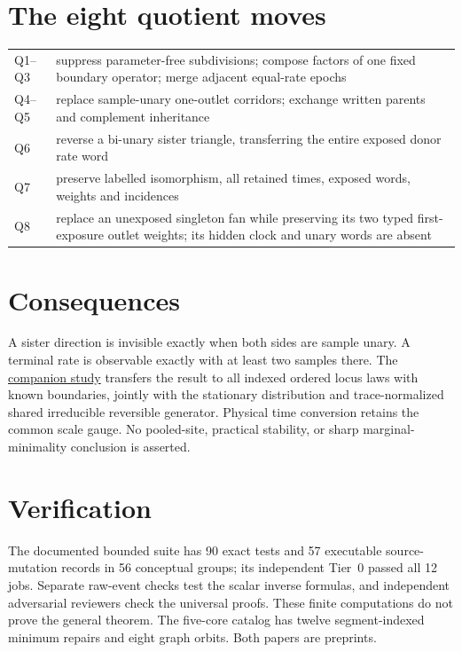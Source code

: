 \documentclass[10pt]{article}
\begin{document}
\section*{The eight quotient moves}
\begin{tabularx}{\textwidth}{@{}p{}X@{}}\toprule
Q1--Q3 & suppress parameter-free subdivisions; compose factors of one fixed boundary operator; merge adjacent equal-rate epochs\\
Q4--Q5 & replace sample-unary one-outlet corridors; exchange written parents and complement inheritance\\
Q6 & reverse a bi-unary sister triangle, transferring the entire exposed donor rate word\\
Q7 & preserve labelled isomorphism, all retained times, exposed words, weights and incidences\\
Q8 & replace an unexposed singleton fan while preserving its two typed first-exposure outlet weights; its hidden clock and unary words are absent\\\bottomrule
\end{tabularx}

\section*{Consequences}
A sister direction is invisible exactly when both sides are sample unary. A terminal rate is observable exactly with at least two samples there. The \href{https://doi.org/10.5281/zenodo.22729537}{companion study} transfers the result to all indexed ordered locus laws with known boundaries, jointly with the stationary distribution and trace-normalized shared irreducible reversible generator. Physical time conversion retains the common scale gauge. No pooled-site, practical stability, or sharp marginal-minimality conclusion is asserted.

\section*{Verification}
The documented bounded suite has 90 exact tests and 57 executable source-mutation records in 56 conceptual groups; its independent Tier~0 passed all 12 jobs. Separate raw-event checks test the scalar inverse formulas, and independent adversarial reviewers check the universal proofs. These finite computations do not prove the general theorem. The five-core catalog has twelve segment-indexed minimum repairs and eight graph orbits. Both papers are preprints.
\end{document}
